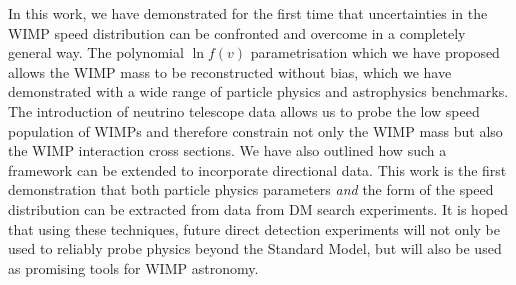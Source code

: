 In this work, we have demonstrated for the first time that uncertainties in the WIMP speed distribution can be confronted and overcome in a completely general way. The polynomial $\ln f(v)$ parametrisation which we have proposed allows the WIMP mass to be reconstructed without bias, which we have demonstrated with a wide range of particle physics and astrophysics benchmarks. The introduction of neutrino telescope data allows us to probe the low speed population of WIMPs and therefore constrain not only the WIMP mass but also the WIMP interaction cross sections. We have also outlined how such a framework can be extended to incorporate directional data. This work is the first demonstration that both particle physics parameters \textit{and} the form of the speed distribution can be extracted from data from DM search experiments. It is hoped that using these techniques, future direct detection experiments will not only be used to reliably probe physics beyond the Standard Model, but will also be used as promising tools for WIMP astronomy.




